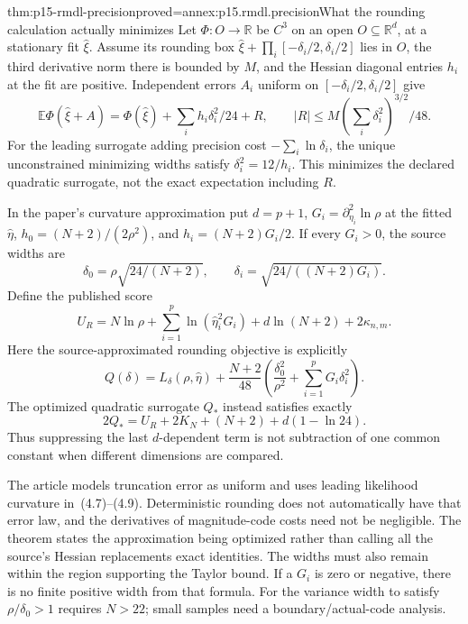 \begin{hbtheorem}{thm:p15-rmdl-precision}{proved=annex:p15.rmdl.precision}{What the rounding calculation actually minimizes}
Let \(\Phi:O\to\mathbb R\) be \(C^3\) on an open
\(O\subseteq\mathbb R^d\), at a stationary fit \(\widehat\xi\).
Assume its rounding box
\(\widehat\xi+\prod_i[-\delta_i/2,\delta_i/2]\) lies in \(O\),
the third derivative norm there is bounded by \(M\), and the Hessian
diagonal entries \(h_i\) at the fit are positive. Independent errors
\(A_i\) uniform on \([-\delta_i/2,\delta_i/2]\) give
\[
 \mathbb E\Phi(\widehat\xi+A)=\Phi(\widehat\xi)
       +\sum_i h_i\delta_i^2/24+R,
 \qquad |R|\leq M(\sum_i\delta_i^2)^{3/2}/48.
\]
For the leading surrogate adding precision cost \(-\sum_i\ln\delta_i\),
the unique unconstrained minimizing widths satisfy
\(\delta_i^2=12/h_i\). This minimizes the declared quadratic surrogate,
not the exact expectation including \(R\).

In the paper's curvature approximation put \(d=p+1\),
\(G_i=\partial_{\eta_i}^2\ln\rho\) at the fitted \(\widehat\eta\),
\(h_0=(N+2)/(2\rho^2)\), and \(h_i=(N+2)G_i/2\).
If every \(G_i>0\), the source widths are
\[
 \delta_0=\rho\sqrt{24/(N+2)},\qquad
 \delta_i=\sqrt{24/((N+2)G_i)}.
\]
Define the published score
\[
 U_R=N\ln\rho+\sum_{i=1}^p\ln(\widehat\eta_i^2G_i)
                +d\ln(N+2)+2\kappa_{n,m}.
\]
Here the source-approximated rounding objective is explicitly
\[
 Q(\delta)=L_\delta(\rho,\widehat\eta)+\frac{N+2}{48}
       \left(\frac{\delta_0^2}{\rho^2}+\sum_{i=1}^pG_i\delta_i^2\right).
\]
The optimized quadratic surrogate \(Q_*\) instead satisfies exactly
\[
 2Q_*=U_R+2K_N+(N+2)+d(1-\ln24).
\]
Thus suppressing the last \(d\)-dependent term is not subtraction of
one common constant when different dimensions are compared.
\end{hbtheorem}

The article models truncation error as uniform and uses leading likelihood
curvature in~(4.7)--(4.9). Deterministic rounding does not automatically
have that error law, and the derivatives of magnitude-code costs need not
be negligible. The theorem states the approximation being optimized rather
than calling all the source's Hessian replacements exact identities.
The widths must also remain within the region supporting the Taylor bound.
If a \(G_i\) is zero or negative, there is no finite positive width from
that formula. For the variance width to satisfy \(\rho/\delta_0>1\)
requires \(N>22\); small samples need a boundary/actual-code analysis.

